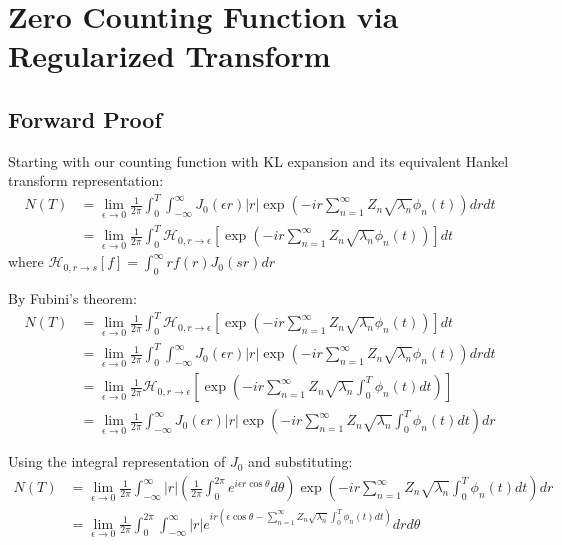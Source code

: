 \documentclass{article}
\begin{document}
\section{Zero Counting Function via Regularized Transform}

\subsection{Forward Proof}
Starting with our counting function with KL expansion and its equivalent Hankel transform representation:
\begin{equation}
\begin{split}
    N(T) &= \lim_{\epsilon \to 0} \frac{1}{2\pi} \int_0^T \int_{-\infty}^{\infty} J_0(\epsilon r)|r| \exp\left(-ir\sum_{n=1}^{\infty} Z_n \sqrt{\lambda_n} \phi_n(t)\right) dr dt \\
    &= \lim_{\epsilon \to 0} \frac{1}{2\pi} \int_0^T \mathcal{H}_{0,r\to\epsilon}\left[\exp\left(-ir\sum_{n=1}^{\infty} Z_n \sqrt{\lambda_n} \phi_n(t)\right)\right] dt
\end{split}
\end{equation}
where $\mathcal{H}_{0,r\to s}[f] = \int_0^\infty rf(r)J_0(sr)dr$

By Fubini's theorem:
\begin{equation}
\begin{split}
    N(T) &= \lim_{\epsilon \to 0} \frac{1}{2\pi} \int_0^T \mathcal{H}_{0,r\to\epsilon}\left[\exp\left(-ir\sum_{n=1}^{\infty} Z_n \sqrt{\lambda_n} \phi_n(t)\right)\right] dt \\
    &= \lim_{\epsilon \to 0} \frac{1}{2\pi} \int_0^T \int_{-\infty}^{\infty} J_0(\epsilon r)|r| \exp\left(-ir\sum_{n=1}^{\infty} Z_n \sqrt{\lambda_n} \phi_n(t)\right) dr dt \\
    &= \lim_{\epsilon \to 0} \frac{1}{2\pi} \mathcal{H}_{0,r\to\epsilon}\left[\exp\left(-ir\sum_{n=1}^{\infty} Z_n \sqrt{\lambda_n} \int_0^T \phi_n(t) dt\right)\right] \\
    &= \lim_{\epsilon \to 0} \frac{1}{2\pi} \int_{-\infty}^{\infty} J_0(\epsilon r)|r| \exp\left(-ir\sum_{n=1}^{\infty} Z_n \sqrt{\lambda_n} \int_0^T \phi_n(t) dt\right) dr
\end{split}
\end{equation}

Using the integral representation of $J_0$ and substituting:
\begin{equation}
\begin{split}
    N(T) &= \lim_{\epsilon \to 0} \frac{1}{2\pi} \int_{-\infty}^{\infty} |r| \left(\frac{1}{2\pi} \int_0^{2\pi} e^{i\epsilon r\cos\theta} d\theta\right) \exp\left(-ir\sum_{n=1}^{\infty} Z_n \sqrt{\lambda_n} \int_0^T \phi_n(t) dt\right) dr \\
    &= \lim_{\epsilon \to 0} \frac{1}{2\pi} \int_0^{2\pi} \int_{-\infty}^{\infty} |r| e^{ir(\epsilon\cos\theta - \sum_{n=1}^{\infty} Z_n \sqrt{\lambda_n} \int_0^T \phi_n(t) dt)} dr d\theta
\end{split}
\end{equation}
\end{document}
